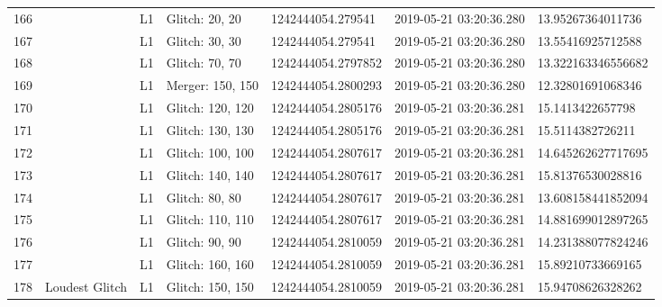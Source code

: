 \begin{longtable}{lllllll}
166  &                                                    &       L1 &    Glitch: 20, 20 &   1242444054.279541 &  2019-05-21 03:20:36.280 &   13.95267364011736 \\
167  &                                                    &       L1 &    Glitch: 30, 30 &   1242444054.279541 &  2019-05-21 03:20:36.280 &   13.55416925712588 \\
168  &                                                    &       L1 &    Glitch: 70, 70 &  1242444054.2797852 &  2019-05-21 03:20:36.280 &  13.322163346556682 \\
169  &                                                    &       L1 &  Merger: 150, 150 &  1242444054.2800293 &  2019-05-21 03:20:36.280 &   12.32801691068346 \\
170  &                                                    &       L1 &  Glitch: 120, 120 &  1242444054.2805176 &  2019-05-21 03:20:36.281 &    15.1413422657798 \\
171  &                                                    &       L1 &  Glitch: 130, 130 &  1242444054.2805176 &  2019-05-21 03:20:36.281 &    15.5114382726211 \\
172  &                                                    &       L1 &  Glitch: 100, 100 &  1242444054.2807617 &  2019-05-21 03:20:36.281 &  14.645262627717695 \\
173  &                                                    &       L1 &  Glitch: 140, 140 &  1242444054.2807617 &  2019-05-21 03:20:36.281 &   15.81376530028816 \\
174  &                                                    &       L1 &    Glitch: 80, 80 &  1242444054.2807617 &  2019-05-21 03:20:36.281 &  13.608158441852094 \\
175  &                                                    &       L1 &  Glitch: 110, 110 &  1242444054.2807617 &  2019-05-21 03:20:36.281 &  14.881699012897265 \\
176  &                                                    &       L1 &    Glitch: 90, 90 &  1242444054.2810059 &  2019-05-21 03:20:36.281 &  14.231388077824246 \\
177  &                                                    &       L1 &  Glitch: 160, 160 &  1242444054.2810059 &  2019-05-21 03:20:36.281 &   15.89210733669165 \\
178  &                                     Loudest Glitch &       L1 &  Glitch: 150, 150 &  1242444054.2810059 &  2019-05-21 03:20:36.281 &   15.94708626328262 \\

\end{longtable}
